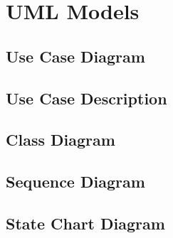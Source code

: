 \chapter{UML Models}

\section{Use Case Diagram}

\section{Use Case Description}

\section{Class Diagram}

\section{Sequence Diagram}

\section{State Chart Diagram}
